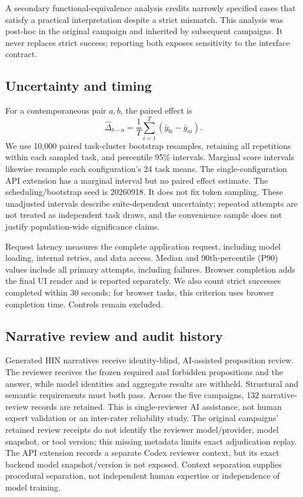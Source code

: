 \documentclass[10pt,twocolumn,letterpaper]{article}
\begin{document}
A secondary functional-equivalence analysis credits narrowly specified cases that satisfy a practical interpretation despite a strict mismatch. This analysis was post-hoc in the original campaign and inherited by subsequent campaigns. It never replaces strict success; reporting both exposes sensitivity to the interface contract.

\subsection{Uncertainty and timing}
For a contemporaneous pair $a,b$, the paired effect is
\begin{equation}
 \widehat\Delta_{b-a}=\frac{1}{T}\sum_{i=1}^{T}(\bar y_{bi}-\bar y_{ai}).
\end{equation}
We use 10,000 paired task-cluster bootstrap resamples, retaining all repetitions within each sampled task, and percentile 95\% intervals. Marginal score intervals likewise resample each configuration's 24 task means. The single-configuration API extension has a marginal interval but no paired effect estimate. The scheduling/bootstrap seed is 20260918. It does not fix token sampling. These unadjusted intervals describe suite-dependent uncertainty; repeated attempts are not treated as independent task draws, and the convenience sample does not justify population-wide significance claims.

Request latency measures the complete application request, including model loading, internal retries, and data access. Median and 90th-percentile (P90) values include all primary attempts, including failures. Browser completion adds the final UI render and is reported separately. We also count strict successes completed within 30 seconds; for browser tasks, this criterion uses browser completion time. Controls remain excluded.

\subsection{Narrative review and audit history}
Generated HIN narratives receive identity-blind, AI-assisted proposition review. The reviewer receives the frozen required and forbidden propositions and the answer, while model identities and aggregate results are withheld. Structural and semantic requirements must both pass. Across the five campaigns, 132 narrative-review records are retained. This is single-reviewer AI assistance, not human expert validation or an inter-rater reliability study. The original campaigns' retained review receipts do not identify the reviewer model/provider, model snapshot, or tool version; this missing metadata limits exact adjudication replay. The API extension records a separate Codex reviewer context, but its exact backend model snapshot/version is not exposed. Context separation supplies procedural separation, not independent human expertise or independence of model training.
\end{document}
